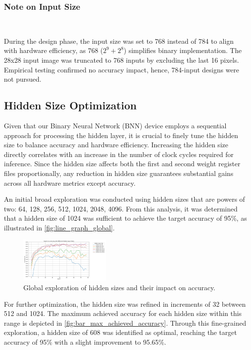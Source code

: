 \documentclass[conference]{IEEEtran}
\begin{document}
\subsubsection{Note on Input Size}
\hfill\\
\label{ref:why_768}

During the design phase, the input size was set to 768 instead of 784 to align with hardware efficiency, as 768 (\(2^9 + 2^8\)) simplifies binary implementation. The 28x28 input image was truncated to 768 inputs by excluding the last 16 pixels. Empirical testing confirmed no accuracy impact, hence, 784-input designs were not pursued.


\subsection{Hidden Size Optimization}
\label{ref:hidden_size_optimization}

Given that our Binary Neural Network (BNN) device employs a sequential approach for processing the hidden layer, it is crucial to finely tune the hidden size to balance accuracy and hardware efficiency. Increasing the hidden size directly correlates with an increase in the number of clock cycles required for inference.
Since the hidden size affects both the first and second weight register files proportionally, any reduction in hidden size guarantees substantial gains across all hardware metrics except accuracy.

An initial broad exploration was conducted using hidden sizes that are powers of two: 64, 128, 256, 512, 1024, 2048, 4096. From this analysis, it was determined that a hidden size of 1024 was sufficient to achieve the target accuracy of 95\%, as illustrated in \autoref{fig:line_graph_global}.

\begin{figure}[h]
    \centering
    \includegraphics[width=0.4\textwidth]{Global_exploration_hidden_sizes.png}
    \caption{Global exploration of hidden sizes and their impact on accuracy.}
    \label{fig:line_graph_global}
\end{figure}

For further optimization, the hidden size was refined in increments of 32 between 512 and 1024. The maximum achieved accuracy for each hidden size within this range is depicted in \autoref{fig:bar_max_achieved_accuracy}. Through this fine-grained exploration, a hidden size of 608 was identified as optimal, reaching the target accuracy of 95\% with a slight improvement to 95.65\%.
\end{document}
